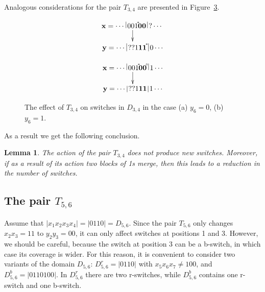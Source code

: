 \documentclass{sn-jnl}
\newtheorem{lem}{Lemma}%
\newcommand{\lllp}{\vline}
\newcommand{\bx}{\mathbf{x}}
\newcommand{\by}{\mathbf{y}}
\newcommand{\gn}[1]{\!^{{}^{{#1}}}\!\!}
\begin{document}
\bigskip

Analogous considerations for the pair $T_{3,4}$ are presented in Figure~\ref{fig:t3t4}.

\begin{figure}[h!]
    \centering
    \begin{subfigure}{0.45\textwidth}
{\scriptsize\[
\xymatrix@C=0.2cm@R=0.5cm{ 
\bx = \cdots \;\lllp 001\gn{*}\boldsymbol{00} \, \lllp\,? \cdots\;\ar[d] \\
\by = \cdots \;\lllp\,??1\boldsymbol{11}\gn{*} \;\lllp\,0 \cdots
}
\]}
    \caption{}
    \label{fig:t3t4(a)}
\end{subfigure}
\hfill
 \begin{subfigure}{0.45\textwidth}
{\scriptsize\[
\xymatrix@C=0.2cm@R=0.5cm{ 
\bx = \cdots \;\lllp  001\gn{*}\boldsymbol{00}\gn{\circ} \;\lllp\,1 \cdots\ar[d] \\
\by = \cdots \;\lllp \,??1\boldsymbol{11} \,\lllp\, 1\cdots 
}
\]}
    \caption{}
    \label{fig:t3t4(b)}
\end{subfigure}
 \caption{The effect of $T_{3,4}$ on switches in $D_{3,4}$ in the case (a) $y_{6}=0$, (b) $y_{6}=1$.}
        \label{fig:t3t4}
\end{figure}

As a result we get the following conclusion.

\begin{lem}\label{lem:t3t4}
The action of the pair $T_{3,4}$ does not produce new switches. Moreover, if as a result of its action two blocks of 1s merge, then this leads to a reduction in the number of switches.
\end{lem}

\subsection{The pair $T_{5,6}$} 

Assume that $|x_1x_{2}x_{3}x_{4}|=|0110|=D_{5,6}$. Since the pair $T_{5,6}$ only changes $x_{2}x_{3}=11$ to $y_{2}y_{3}=00$, it can only affect switches at positions 1 and 3. However, we should be careful, because the switch at position 3 can be a b-switch, in which case its coverage is wider. For this reason, it is convenient to consider two variants of the domain $D_{5,6}$: $D_{5,6}^r=|0110|$ with $x_5x_6x_7\neq 100$, and $D_{5,6}^b=|0110100|$. In $D_{5,6}^r$ there are two r-switches, while $D_{5,6}^b$ contains one r-switch and one b-switch. 
\end{document}
